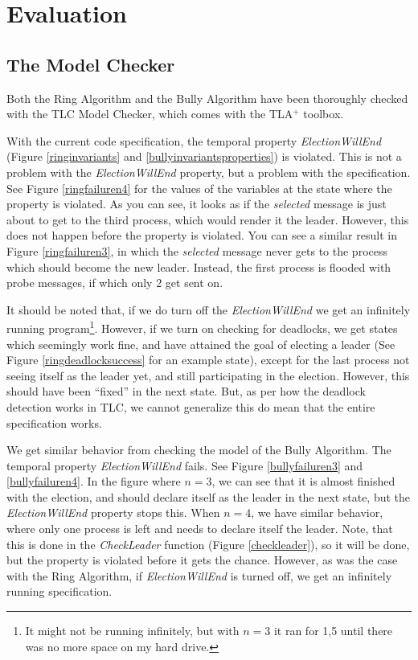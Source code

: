 \documentclass{report}
\begin{document}
\chapter{Evaluation}
\section{The Model Checker}
Both the Ring Algorithm and the Bully Algorithm have been thoroughly checked with the TLC Model Checker, which comes with the TLA$^{+}$ toolbox.

With the current code specification, the temporal property \textit{ElectionWillEnd} (Figure \ref{ringinvariants} and \ref{bullyinvariantsproperties}) is violated. This is not a problem with the \textit{ElectionWillEnd} property, but a problem with the specification. See Figure \ref{ringfailuren4} for the values of the variables at the state where the property is violated. As you can see, it looks as if the \textit{selected} message is just about to get to the third process, which would render it the leader. However, this does not happen before the property is violated. You can see a similar result in Figure \ref{ringfailuren3}, in which the \textit{selected} message never gets to the process which should become the new leader. Instead, the first process is flooded with probe messages, if which only 2 get sent on.

It should be noted that, if we do turn off the \textit{ElectionWillEnd} we get an infinitely running program\footnote{It might not be running infinitely, but with $n = 3$ it ran for 1,5 until there was no more space on my hard drive.}. However, if we turn on checking for deadlocks, we get states which seemingly work fine, and have attained the goal of electing a leader (See Figure \ref{ringdeadlocksuccess} for an example state), except for the last process not seeing itself as the leader yet, and still participating in the election. However, this should have been ``fixed'' in the next state. But, as per how the deadlock detection works in TLC, we cannot generalize this do mean that the entire specification works.

We get similar behavior from checking the model of the Bully Algorithm. The temporal property \textit{ElectionWillEnd} fails. See Figure \ref{bullyfailuren3} and \ref{bullyfailuren4}. In the figure where $n = 3$, we can see that it is almost finished with the election, and should declare itself as the leader in the next state, but the \textit{ElectionWillEnd} property stops this. When $n=4$, we have similar behavior, where only one process is left and needs to declare itself the leader. Note, that this is done in the \textit{CheckLeader} function (Figure \ref{checkleader}), so it will be done, but the property is violated before it gets the chance. However, as was the case with the Ring Algorithm, if \textit{ElectionWillEnd} is turned off, we get an infinitely running specification.
\end{document}
